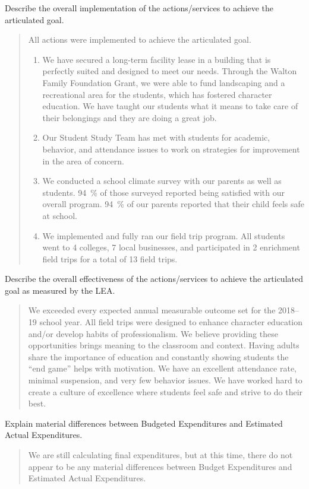\documentclass{article}
\newcounter{goal}[section] %
\newcounter{action}[goal]
\newenvironment{actionanalysis}
	{
		\begin{enumerate}[{\bf {Action} 1:}]
	}
	{
		\end{enumerate}
	}
\begin{document}
Describe the overall implementation of the actions/services to achieve the articulated goal.
\begin{quotation}
	All actions were implemented to achieve the articulated goal.
	\begin{actionanalysis}
	\item We have secured a long-term facility lease in a building that is perfectly suited and designed to meet our needs. Through the Walton Family Foundation Grant, we were able to fund landscaping and a recreational area for the students, which has fostered character education. We have taught our students what it means to take care of their belongings and they are doing a great job.
	\item Our Student Study Team has met with students for academic, behavior, and attendance issues to work on strategies for improvement in the area of concern.
	\item We conducted a school climate survey with our parents as well as students. \SI{94}{\percent} of those surveyed reported being satisfied with our overall program. \SI{94}{\percent} of our parents reported that their child feels safe at school.
	\item We implemented and fully ran our field trip program. All students went to 4 colleges, 7 local businesses, and participated in 2 enrichment field trips for a total of 13 field trips.
	\end{actionanalysis}
\end{quotation}

Describe the overall effectiveness of the actions/services to achieve the articulated goal as measured by the LEA.
\begin{quotation}
	We exceeded every expected annual measurable outcome set for the 2018--19 school year. All field trips were designed to enhance character education and/or develop habits of professionalism. We believe providing these opportunities brings meaning to the classroom and context. Having adults share the importance of education and constantly showing students the ``end game'' helps with motivation. We have an excellent attendance rate, minimal suspension, and very few behavior issues. We have worked hard to create a culture of excellence where students feel safe and strive to do their best.
\end{quotation}

Explain material differences between Budgeted Expenditures and Estimated Actual Expenditures.
\begin{quotation}
	We are still calculating final expenditures, but at this time, there do not appear to be any material differences between Budget Expenditures and Estimated Actual Expenditures.
\end{quotation}
\end{document}
